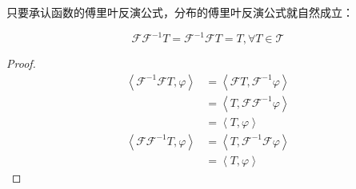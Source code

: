 \documentclass{ctexbook}
\begin{document}
只要承认函数的傅里叶反演公式，分布的傅里叶反演公式就自然成立：\begin{theorem}[分布的傅里叶反演公式]
    \[\mathcal{F} \mathcal{F} ^{-1}T=\mathcal{F} ^{-1}\mathcal{F} T=T,\forall T\in\mathcal{T}\]
\end{theorem}
\begin{proof}
    \begin{align*}
    \left\langle \mathcal{F} ^{-1}\mathcal{F} T,\varphi\right\rangle & =\left\langle \mathcal{F} T,\mathcal{F} ^{-1}\varphi\right\rangle \\
                                                          & =\left\langle T,\mathcal{F} \mathcal{F} ^{-1}\varphi\right\rangle \\
                                                          & =\left\langle T,\varphi\right\rangle                              \\
    \left\langle \mathcal{F} \mathcal{F} ^{-1}T,\varphi\right\rangle & =\left\langle T,\mathcal{F} ^{-1}\mathcal{F} \varphi\right\rangle \\
                                                          & =\left\langle T,\varphi\right\rangle
\end{align*}
\end{proof}
\end{document}
